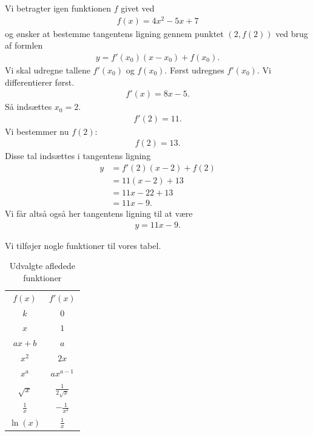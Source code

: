 \begin{exa}
	Vi betragter igen funktionen $f$ givet ved
	\begin{align*}
		f(x) = 4x^2-5x+7
	\end{align*}
	og ønsker at bestemme tangentens ligning gennem punktet $(2,f(2))$ ved brug af formlen
	\begin{align*}
		y = f'(x_0)(x-x_0) + f(x_0).
	\end{align*}
	Vi skal udregne tallene $f'(x_0)$ og $f(x_0)$. Først udregnes $f'(x_0)$.
	Vi differentierer først.
	\begin{align*}
		f'(x) = 8x - 5.
	\end{align*}
	Så indsættes $x_0 = 2.$
	\begin{align*}
		f'(2) = 11.	
	\end{align*}	 
	Vi bestemmer nu $f(2)$:
	\begin{align*}
		f(2) = 13.
	\end{align*}
	Disse tal indsættes i tangentens ligning
	\begin{align*}
		y &= f'(2)(x-2) + f(2)\\
		&= 11(x-2)+13\\
		&= 11x-22+13\\
		&= 11x-9.
	\end{align*}
	Vi får altså også her tangentens ligning til at være
	\begin{align*}
		y = 11x-9.
	\end{align*}
\end{exa}

Vi tilføjer nogle funktioner til vores tabel.
\begin{table}[H]
	\centering
	\begin{tabular}{cc}
		$f(x)$ & $f'(x)$ \\
		$k$ & $0$ \\
		$x$ & $1$ \\
		$ax + b$  & $a$ \\
		$x^2$ & $2x$ \\
		$x^a$ & $ax^{a-1} $ \\
		$\sqrt{x}$ & $\frac{1}{2\sqrt{x}}$ \\
		$\frac{1}{x}$ & $-\frac{1}{x^2}$ \\
		$\ln(x)$ & $\frac{1}{x}$ \\
	\end{tabular}
	\caption{Udvalgte afledede funktioner}
	\label{tab:afledt}
\end{table}

